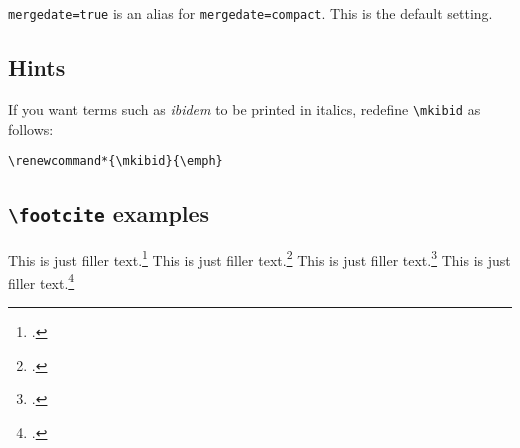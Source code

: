 \documentclass[a4paper]{article}
\newcommand{\cmd}[1]{\texttt{\textbackslash #1}}
\begin{document}
\texttt{mergedate=true} is an alias for \texttt{mergedate=compact}.
This is the default setting.

\subsection*{Hints}

If you want terms such as \emph{ibidem} to be printed in italics,
redefine \cmd{mkibid} as follows:

\begin{verbatim}
\renewcommand*{\mkibid}{\emph}
\end{verbatim}

\subsection*{\cmd{footcite} examples}

This is just filler text.\footcite{companion}
This is just filler text.\footcite{companion}
\clearpage
This is just filler text.\footcite[55]{companion}
This is just filler text.\footcite[55]{companion}

\clearpage
\printbibliography
\end{document}
